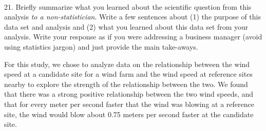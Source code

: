 \documentclass[
  letterpaper,
  DIV=11,
  numbers=noendperiod]{scrartcl}
\makeatletter
\let\oldparagraph\paragraph
\renewcommand{\paragraph}{
    \@ifstar
      \xxxParagraphStar
      \xxxParagraphNoStar
  }
\newcommand{\xxxParagraphStar}[1]{\oldparagraph*{#1}\mbox{}}
\newcommand{\xxxParagraphNoStar}[1]{\oldparagraph{#1}\mbox{}}
\makeatother
\begin{document}
\paragraph{\texorpdfstring{21. Briefly summarize what you learned about
the scientific question from this analysis \emph{to a non-statistician}.
Write a few sentences about (1) the purpose of this data set and
analysis and (2) what you learned about this data set from your
analysis. Write your response as if you were addressing a business
manager (avoid using statistics jargon) and just provide the main
take-aways.}{21. Briefly summarize what you learned about the scientific question from this analysis to a non-statistician. Write a few sentences about (1) the purpose of this data set and analysis and (2) what you learned about this data set from your analysis. Write your response as if you were addressing a business manager (avoid using statistics jargon) and just provide the main take-aways.}}\label{briefly-summarize-what-you-learned-about-the-scientific-question-from-this-analysis-to-a-non-statistician.-write-a-few-sentences-about-1-the-purpose-of-this-data-set-and-analysis-and-2-what-you-learned-about-this-data-set-from-your-analysis.-write-your-response-as-if-you-were-addressing-a-business-manager-avoid-using-statistics-jargon-and-just-provide-the-main-take-aways.}

For this study, we chose to analyze data on the relationship between the
wind speed at a candidate site for a wind farm and the wind speed at
reference sites nearby to explore the strength of the relationship
between the two. We found that there was a strong positive relationship
between the two wind speeds, and that for every meter per second faster
that the wind was blowing at a reference site, the wind would blow about
0.75 meters per second faster at the candidate site.
\end{document}
